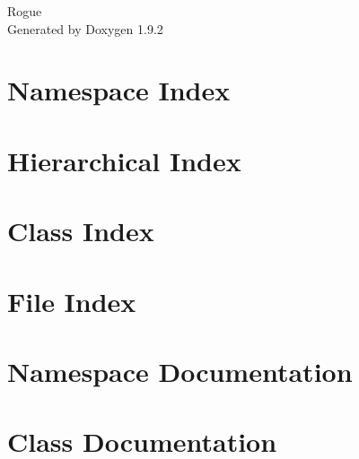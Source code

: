 \documentclass[twoside]{book}
\newcommand{\+}{\discretionary{\mbox{\scriptsize$\hookleftarrow$}}{}{}}
\newcommand{\clearemptydoublepage}{%
    \newpage{\pagestyle{empty}\cleardoublepage}%
  }
\begin{document}
  \raggedbottom
    \hypersetup{pageanchor=false,
                bookmarksnumbered=true,
                pdfencoding=unicode
               }
  \begin{titlepage}
  \vspace*{7cm}
  \begin{center}%
  {\Large Rogue}\\
  \vspace*{1cm}
  {\large Generated by Doxygen 1.9.2}\\
  \end{center}
  \end{titlepage}
  \clearemptydoublepage
  \tableofcontents
  \clearemptydoublepage
  \hypersetup{pageanchor=true}
\chapter{Namespace Index}

\chapter{Hierarchical Index}

\chapter{Class Index}

\chapter{File Index}

\chapter{Namespace Documentation}

\chapter{Class Documentation}

















\end{document}
